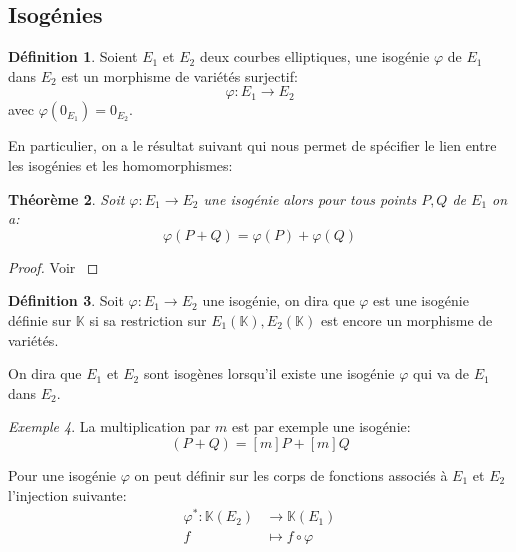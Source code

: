 \documentclass[10pt,a4paper]{book}
\theoremstyle{plain}
\newtheorem{thm}{Théorème}[chapter]
\theoremstyle{definition}
\theoremstyle{definition}
\theoremstyle{definition}
\theoremstyle{definition}
\theoremstyle{definition}
\newtheorem{defi}[thm]{Définition}
\theoremstyle{remark}
\theoremstyle{remark}
\newtheorem{exe}[thm]{Exemple}
\theoremstyle{definition}
\begin{document}
\subsection{Isogénies}

\begin{defi}
Soient $E_1$ et $E_2$ deux courbes elliptiques, une isogénie $\varphi$ de $E_1$ dans $E_2$ est un morphisme de variétés surjectif:
\begin{equation*}
\varphi:E_1 \rightarrow E_2
\end{equation*}
avec $\varphi(0_{E_1})=0_{E_2}$.
\end{defi}
En particulier, on a le résultat suivant qui nous permet de spécifier le lien 
entre les isogénies et les homomorphismes:

\begin{thm}
Soit $\varphi:E_1 \rightarrow E_2$ une isogénie alors pour tous points $P,Q$ de $E_1$ on a:
\begin{equation*}
\varphi(P+Q)=\varphi(P)+\varphi(Q)
\end{equation*}
\end{thm}

\begin{proof}
Voir \cite[Theoreme III.4.8]{Silv1}
\end{proof}

\begin{defi}
Soit $\varphi: E_1 \rightarrow E_2$ une isogénie, on dira que $\varphi$ est une
isogénie définie sur $\mathbb{K}$ si sa restriction sur $E_1(\mathbb{K}),
E_2(\mathbb{K})$ est encore un morphisme de variétés.
\end{defi}

On dira que $E_1$ et $E_2$ sont isogènes lorsqu'il existe une isogénie $\varphi$ qui va de $E_1$ dans $E_2$. 

\begin{exe}
La multiplication par $m$ est par exemple une isogénie:
\begin{equation*}
[m](P+Q)=[m]P+[m]Q
\end{equation*}
\end{exe}

Pour une isogénie $\varphi$ on peut définir sur les corps de fonctions associés à $E_1$ et $E_2$ l'injection suivante:
\begin{equation*}
\begin{alignedat}{1}
\varphi^*: \mathbb{K}(E_2) & \rightarrow \mathbb{K}(E_1) \\
f & \mapsto f  \circ \varphi
\end{alignedat}
\end{equation*}
\end{document}
